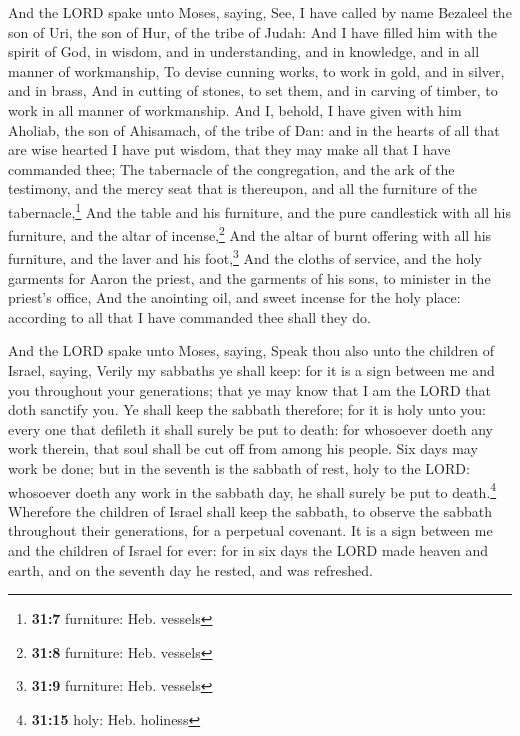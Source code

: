  And the LORD spake unto Moses, saying, 
See, I have called by name Bezaleel the son of Uri, the son of Hur, of
the tribe of Judah:  And I have filled him with the spirit
of God, in wisdom, and in understanding, and in knowledge, and in all
manner of workmanship,  To devise cunning works, to work
in gold, and in silver, and in brass,  And in cutting of
stones, to set them, and in carving of timber, to work in all manner of
workmanship.  And I, behold, I have given with him
Aholiab, the son of Ahisamach, of the tribe of Dan: and in the hearts of
all that are wise hearted I have put wisdom, that they may make all that
I have commanded thee;  The tabernacle of the
congregation, and the ark of the testimony, and the mercy seat that is
thereupon, and all the furniture of the tabernacle,\footnote{\textbf{31:7}
  furniture: Heb. vessels}  And the table and his
furniture, and the pure candlestick with all his furniture, and the
altar of incense,\footnote{\textbf{31:8} furniture: Heb. vessels}
 And the altar of burnt offering with all his furniture,
and the laver and his foot,\footnote{\textbf{31:9} furniture: Heb.
  vessels}  And the cloths of service, and the holy
garments for Aaron the priest, and the garments of his sons, to minister
in the priest's office,  And the anointing oil, and sweet
incense for the holy place: according to all that I have commanded thee
shall they do.

 And the LORD spake unto Moses, saying, 
Speak thou also unto the children of Israel, saying, Verily my sabbaths
ye shall keep: for it is a sign between me and you throughout your
generations; that ye may know that I am the LORD that doth sanctify you.
 Ye shall keep the sabbath therefore; for it is holy unto
you: every one that defileth it shall surely be put to death: for
whosoever doeth any work therein, that soul shall be cut off from among
his people.  Six days may work be done; but in the
seventh is the sabbath of rest, holy to the LORD: whosoever doeth any
work in the sabbath day, he shall surely be put to death.\footnote{\textbf{31:15}
  holy: Heb. holiness}  Wherefore the children of Israel
shall keep the sabbath, to observe the sabbath throughout their
generations, for a perpetual covenant.  It is a sign
between me and the children of Israel for ever: for in six days the LORD
made heaven and earth, and on the seventh day he rested, and was
refreshed.

